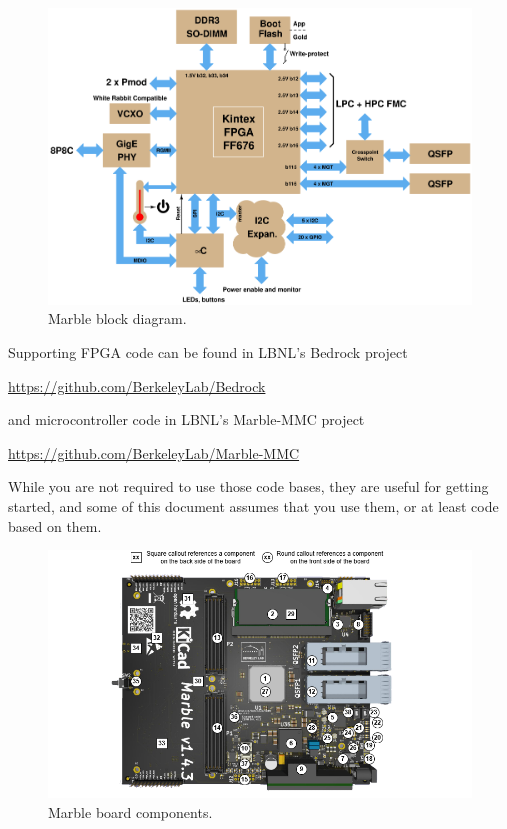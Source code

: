\documentclass[12pt,oneside,a4]{article}
\begin{document}
\begin{figure}[H]
\begin{center}
\includegraphics[width=1\linewidth]{block_k3.png}
 \caption{Marble block diagram.}\label{fig:block}
\end{center}
\end{figure}

Supporting FPGA code can be found in LBNL's Bedrock project

\begin{leftbar}
\url{https://github.com/BerkeleyLab/Bedrock}
\end{leftbar}

and microcontroller code in LBNL's Marble-MMC project

\begin{leftbar}
\url{https://github.com/BerkeleyLab/Marble-MMC}
\end{leftbar}

While you are not required to use those code bases, they are useful for
getting started, and some of this document assumes that you use them,
or at least code based on them.

\begin{figure}[H]
\begin{center}
\includegraphics[width=1\linewidth]{marble_references.png}
 \caption{Marble board components.}\label{fig:components}
\end{center}
\end{figure}
\end{document}
